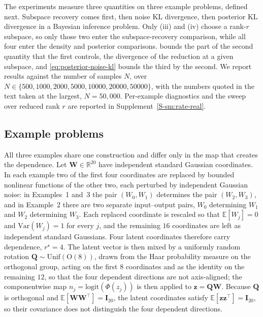\documentclass[review,hidelinks,onefignum,onetabnum]{siamart251216}
\newcommand{\RR}{\mathbb{R}}
\newcommand{\EE}{\mathbb{E}}
\newcommand{\Var}{\mathrm{Var}}
\newcommand{\mQ}{\bm{Q}}
\newcommand{\mI}{\bm{I}}
\newcommand{\vz}{\bm{z}}
\newcommand{\vW}{\bm{W}}
\begin{document}
The experiments measure three quantities on three example problems, defined next. Subspace recovery comes first, then noise KL divergence, then posterior KL divergence in a Bayesian inference problem. Only (iii) and (iv) choose a rank-$r$ subspace, so only those two enter the subspace-recovery comparison, while all four enter the density and posterior comparisons.  bounds the part of the second quantity that the first controls, the divergence of the reduction at a given subspace, and \eqref{eq:posterior-noise-kl} bounds the third by the second. We report results against the number of samples $N$, over $N \in \{500, 1000, 2000, 5000, 10000, 20000, 50000\}$, with the numbers quoted in the text taken at the largest, $N = 50{,}000$. Per-example diagnostics and the sweep over reduced rank $r$ are reported in Supplement~\ref{S-sm:rate-real}.

\subsection{Example problems}
\label{sec:exp-benchmark}

All three examples share one construction and differ only in the map that creates the dependence. Let $\vW \in \RR^{20}$ have independent standard Gaussian coordinates. In each example two of the first four coordinates are replaced by bounded nonlinear functions of the other two, each perturbed by independent Gaussian noise: in Examples~1 and~3 the pair $(W_0, W_1)$ determines the pair $(W_2, W_3)$, and in Example~2 there are two separate input--output pairs, $W_0$ determining $W_1$ and $W_2$ determining $W_3$. Each replaced coordinate is rescaled so that $\EE[W_j] = 0$ and $\Var(W_j) = 1$ for every $j$, and the remaining $16$ coordinates are left as independent standard Gaussians. Four latent coordinates therefore carry dependence, $r^\star = 4$. The latent vector is then mixed by a uniformly random rotation $\mQ \sim \mathrm{Unif}(\mathrm{O}(8))$, drawn from the Haar probability measure on the orthogonal group, acting on the first $8$ coordinates and as the identity on the remaining $12$, so that the four dependent directions are not axis-aligned; the componentwise map $n_j = \mathrm{logit}(\Phi(z_j))$ is then applied to $\vz = \mQ\vW$. Because $\mQ$ is orthogonal and $\EE[\vW\vW^\top] = \mI_{20}$, the latent coordinates satisfy $\EE[\vz\vz^\top] = \mI_{20}$, so their covariance does not distinguish the four dependent directions.
\end{document}
